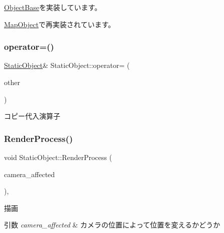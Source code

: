 \mbox{\hyperlink{class_object_base_af133f36f2bca1dcfd962e2cfac61ab51}{Object\+Base}}を実装しています。



\mbox{\hyperlink{class_map_object_a3043cddb8aaad0eab27a076e9bee0284}{Map\+Object}}で再実装されています。

\mbox{\label{class_static_object_aa2a0526bd19e479ea4d1e5da236c1bf3}} 
\subsubsection{\texorpdfstring{operator=()}{operator=()}}
{\footnotesize\ttfamily \mbox{\hyperlink{class_static_object}{Static\+Object}}\& Static\+Object\+::operator= (\begin{DoxyParamCaption}\item[{const \mbox{\hyperlink{class_static_object}{Static\+Object}} \&}]{other }\end{DoxyParamCaption})\hspace{0.3cm}{\ttfamily [inline]}}



コピー代入演算子 

\mbox{\label{class_static_object_afec57009537695c4715386120a619942}} 
\subsubsection{\texorpdfstring{Render\+Process()}{RenderProcess()}}
{\footnotesize\ttfamily void Static\+Object\+::\+Render\+Process (\begin{DoxyParamCaption}\item[{bool}]{camera\+\_\+affected }\end{DoxyParamCaption})\hspace{0.3cm}{\ttfamily [protected]}, {\ttfamily [virtual]}}



描画 


\begin{DoxyParams}{引数}
{\em camera\+\_\+affected} & カメラの位置によって位置を変えるかどうか \\
\hline
\end{DoxyParams}


